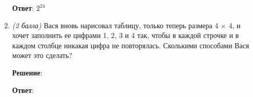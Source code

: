 \documentclass{article}
\begin{document}
\begin{enumerate}
        \textbf{Ответ}:
        $2^{24}$

        \item \textit{(2 балла)} Вася вновь нарисовал таблицу, только теперь размера 4 × 4, и хочет заполнить ее цифрами 1, 2, 3 и 4 так, чтобы в каждой строчке и в каждом столбце никакая цифра не повторялась. Сколькими способами Вася может это сделать?
        
        \textbf{Решение}:

        \textbf{Ответ}:

    \end{enumerate}
\end{document}
